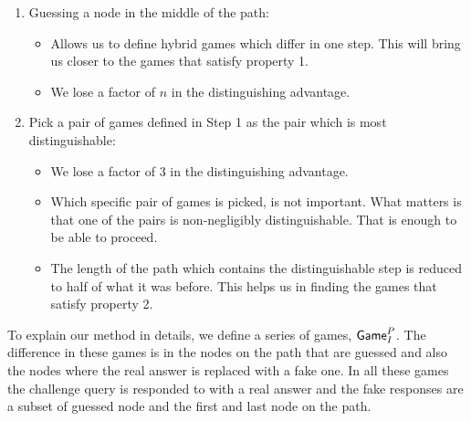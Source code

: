 \documentclass{article}
\newcommand{\game}{{\sf Game}}
\newcommand{\dgg}[2]{\game_{#1}^{#2}}
\begin{document}
\begin{enumerate}[Step 1.]
\item Guessing a node in the middle of the path: \begin{itemize} \item Allows us to define hybrid games which differ in one step.  This will bring us closer to the games that satisfy property 1. \item We lose a factor of $n$ in the distinguishing advantage. \end{itemize}
\item Pick a pair of games defined in Step 1 as the pair which is most distinguishable: \begin{itemize} \item We lose a factor of 3 in the distinguishing advantage. \item  Which specific pair of games is picked, is not important. What matters is that one of the pairs is non-negligibly distinguishable. That is enough to be able to proceed. \item The length of the path which contains the distinguishable step is reduced to half of what it was before. This helps us in finding the games that satisfy property 2.
\end{itemize}
\end{enumerate}

To explain our method in details, we define a series of games, $\dgg{I}{P}$. The difference in these games is in the nodes on the path that are guessed and also the nodes where the real answer is replaced with a fake one. In all these games the challenge query is responded to with a real answer and the fake responses are a subset of guessed node and the first and last node on the path. 
\end{document}
